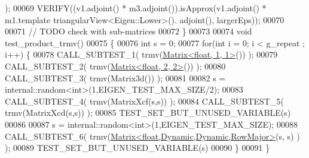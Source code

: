 \begin{DoxyCode}
      );
00069   VERIFY((v1.adjoint() * m3.adjoint()).isApprox(v1.adjoint() * m1.template triangularView<Eigen::Lower>().
      adjoint(), largerEps));
00070 
00071   \textcolor{comment}{// TODO check with sub-matrices}
00072 \}
00073 
00074 \textcolor{keywordtype}{void} test\_product\_trmv()
00075 \{
00076   \textcolor{keywordtype}{int} s = 0;
00077   \textcolor{keywordflow}{for}(\textcolor{keywordtype}{int} i = 0; i < g\_repeat ; i++) \{
00078     CALL\_SUBTEST\_1( trmv(\hyperlink{group___core___module_class_eigen_1_1_matrix}{Matrix<float, 1, 1>}()) );
00079     CALL\_SUBTEST\_2( trmv(\hyperlink{group___core___module_class_eigen_1_1_matrix}{Matrix<float, 2, 2>}()) );
00080     CALL\_SUBTEST\_3( trmv(Matrix3d()) );
00081     
00082     s = internal::random<int>(1,EIGEN\_TEST\_MAX\_SIZE/2);
00083     CALL\_SUBTEST\_4( trmv(MatrixXcf(s,s)) );
00084     CALL\_SUBTEST\_5( trmv(MatrixXcd(s,s)) );
00085     TEST\_SET\_BUT\_UNUSED\_VARIABLE(s)
00086     
00087     s = internal::random<int>(1,EIGEN\_TEST\_MAX\_SIZE);
00088     CALL\_SUBTEST\_6( trmv(\hyperlink{group___core___module_class_eigen_1_1_matrix}{Matrix<float,Dynamic,Dynamic,RowMajor>}(s, s)
      ) );
00089     TEST\_SET\_BUT\_UNUSED\_VARIABLE(s)
00090   \}
00091 \}
\end{DoxyCode}
